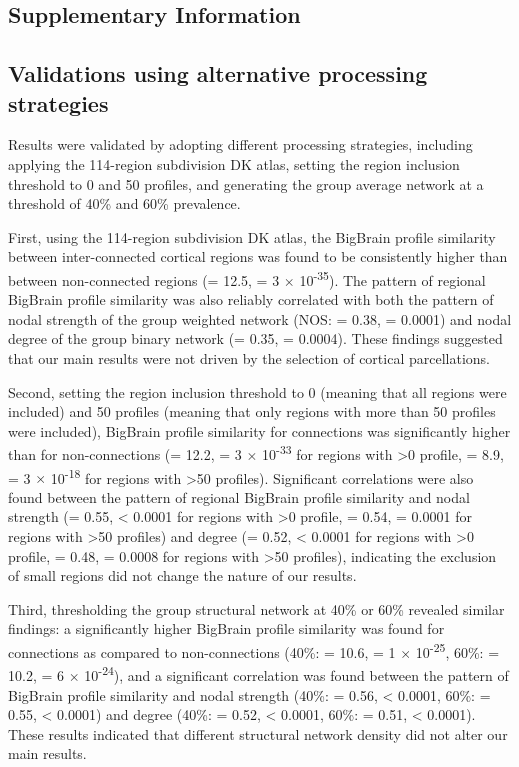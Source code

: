 \begin{refsection}
\newpage
\section*{Supplementary Information}
\subsection*{Validations using alternative processing strategies}
Results were validated by adopting different processing strategies, including applying the 114-region subdivision DK atlas, setting the region inclusion threshold to 0 and 50 profiles, and generating the group average network at a threshold of 40\% and 60\% prevalence.

First, using the 114-region subdivision DK atlas, the BigBrain profile similarity between inter-connected cortical regions was found to be consistently higher than between non-connected regions (\tval = 12.5, \pval = 3 $\times$ 10\textsuperscript{-35}). The pattern of regional BigBrain profile similarity was also reliably correlated with both the pattern of nodal strength of the group weighted network (NOS: \rval = 0.38, \pval = 0.0001) and nodal degree of the group binary network (\rval = 0.35, \pval = 0.0004). These findings suggested that our main results were not driven by the selection of cortical parcellations. 

Second, setting the region inclusion threshold to 0 (meaning that all regions were included) and 50 profiles (meaning that only regions with more than 50 profiles were included), BigBrain profile similarity for connections was significantly higher than for non-connections (\tval = 12.2, \pval = 3 $\times$ 10\textsuperscript{-33} for regions with >0 profile, \tval = 8.9, \pval = 3 $\times$ 10\textsuperscript{-18} for regions with >50 profiles). Significant correlations were also found between the pattern of regional BigBrain profile similarity and nodal strength (\rval = 0.55, \pval < 0.0001 for regions with >0 profile, \rval = 0.54, \pval = 0.0001 for regions with >50 profiles) and degree (\rval = 0.52, \pval < 0.0001 for regions with >0 profile, \rval = 0.48, \pval = 0.0008 for regions with >50 profiles), indicating the exclusion of small regions did not change the nature of our results. 

Third, thresholding the group structural network at 40\% or 60\% revealed similar findings: a significantly higher BigBrain profile similarity was found for connections as compared to non-connections (40\%: \tval = 10.6, \pval = 1 $\times$ 10\textsuperscript{-25}, 60\%: \tval = 10.2, \pval = 6 $\times$ 10\textsuperscript{-24}), and a significant correlation was found between the pattern of BigBrain profile similarity and nodal strength (40\%: \rval = 0.56, \pval < 0.0001, 60\%: \rval = 0.55, \pval < 0.0001) and degree (40\%: \rval = 0.52, \pval < 0.0001, 60\%:  \rval = 0.51, \pval < 0.0001). These results indicated that different structural network density did not alter our main results.


\end{refsection}
